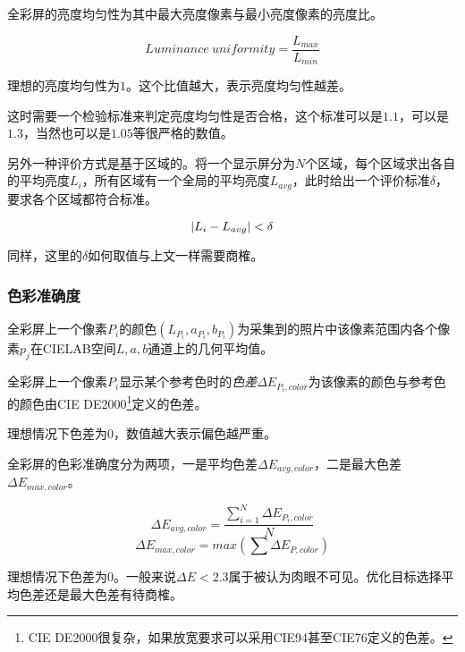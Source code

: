 \begin{defn}
    全彩屏的亮度均匀性为其中最大亮度像素与最小亮度像素的亮度比。

    \begin{equation}
        Luminance\ uniformity = \frac{L_{max}}{L_{min}}
    \end{equation}
\end{defn}

理想的亮度均匀性为$1$。这个比值越大，表示亮度均匀性越差。

这时需要一个检验标准来判定亮度均匀性是否合格，这个标准可以是$1.1$，可以是$1.3$，当然也可以是$1.05$等很严格的数值。

另外一种评价方式是基于区域的。将一个显示屏分为$N$个区域，每个区域求出各自的平均亮度$L_i$，所有区域有一个全局的平均亮度$L_{avg}$，此时给出一个评价标准$\delta$，要求各个区域都符合标准。

\begin{equation}
    \left|L_i - L_{avg}\right| < \delta
\end{equation}

同样，这里的$\delta$如何取值与上文一样需要商榷。


\subsubsection{色彩准确度} %
\label{ssub:color_accuracy}

\begin{defn}
    全彩屏上一个像素$P_i$的颜色$(L_{P_i},a_{P_i},b_{P_i})$为采集到的照片中该像素范围内各个像素$p_j$在CIELAB空间$L,a,b$通道上的几何平均值。
\end{defn}

\begin{defn}
    全彩屏上一个像素$P_i$显示某个参考色时的\emph{色差}$\Delta E_{P_i,color}$为该像素的颜色与参考色的颜色由CIE DE2000\footnote{CIE DE2000很复杂，如果放宽要求可以采用CIE94甚至CIE76定义的色差。}定义的色差。

\end{defn}

理想情况下色差为$0$，数值越大表示偏色越严重。

\begin{defn}
    全彩屏的色彩准确度分为两项，一是平均色差$\Delta E_{avg,color}$，二是最大色差$\Delta E_{max,color}$。

    \begin{equation}
        \Delta E_{avg,color} = \frac{\sum_{i=1}^N{\Delta E_{P_i,color}}}{N}
    \end{equation}
    \begin{equation}
        \Delta E_{max,color} = max\left(\sum{\Delta E_{P,color}}\right)
    \end{equation}
\end{defn}

理想情况下色差为$0$。一般来说$\Delta E<2.3$属于被认为肉眼不可见。优化目标选择平均色差还是最大色差有待商榷。



